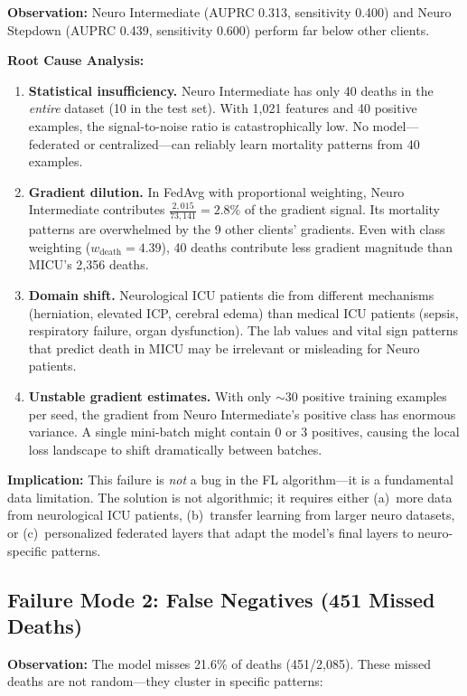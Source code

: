 \documentclass[11pt,a4paper]{report}
\begin{document}
\textbf{Observation:} Neuro Intermediate (AUPRC 0.313, sensitivity 0.400) and Neuro Stepdown (AUPRC 0.439, sensitivity 0.600) perform far below other clients.

\textbf{Root Cause Analysis:}
\begin{enumerate}[leftmargin=2em]
\item \textbf{Statistical insufficiency.} Neuro Intermediate has only 40 deaths in the \emph{entire} dataset (10 in the test set). With 1,021 features and 40 positive examples, the signal-to-noise ratio is catastrophically low. No model---federated or centralized---can reliably learn mortality patterns from 40 examples.
\item \textbf{Gradient dilution.} In FedAvg with proportional weighting, Neuro Intermediate contributes $\frac{2{,}015}{73{,}141} = 2.8\%$ of the gradient signal. Its mortality patterns are overwhelmed by the 9 other clients' gradients. Even with class weighting ($w_\text{death}=4.39$), 40 deaths contribute less gradient magnitude than MICU's 2,356 deaths.
\item \textbf{Domain shift.} Neurological ICU patients die from different mechanisms (herniation, elevated ICP, cerebral edema) than medical ICU patients (sepsis, respiratory failure, organ dysfunction). The lab values and vital sign patterns that predict death in MICU may be irrelevant or misleading for Neuro patients.
\item \textbf{Unstable gradient estimates.} With only $\sim$30 positive training examples per seed, the gradient from Neuro Intermediate's positive class has enormous variance. A single mini-batch might contain 0 or 3 positives, causing the local loss landscape to shift dramatically between batches.
\end{enumerate}

\textbf{Implication:} This failure is \emph{not} a bug in the FL algorithm---it is a fundamental data limitation. The solution is not algorithmic; it requires either (a)~more data from neurological ICU patients, (b)~transfer learning from larger neuro datasets, or (c)~personalized federated layers that adapt the model's final layers to neuro-specific patterns.

\subsection{Failure Mode 2: False Negatives (451 Missed Deaths)}

\textbf{Observation:} The model misses 21.6\% of deaths (451/2,085). These missed deaths are not random---they cluster in specific patterns:
\end{document}
